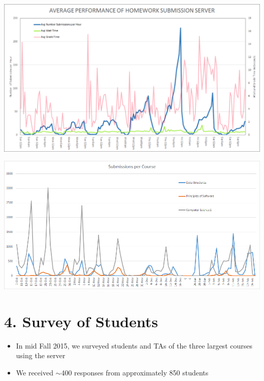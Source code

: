 \documentclass[thesis]{hmcposter}
\begin{document}
\begin{poster}
\begin{center}
\includegraphics[width=12in]{avg_sub_wait_time}
\end{center}

\begin{center}
\includegraphics[width=12in]{loadperclass}
\end{center}

\columnbreak

\section{4. Survey of Students}%
\begin{itemize}
    \item In mid Fall 2015, we surveyed students and TAs of the three largest courses using the server
    \item We received $\sim$400 responses from approximately 850 students
\end{itemize}

\end{poster}
\end{document}
